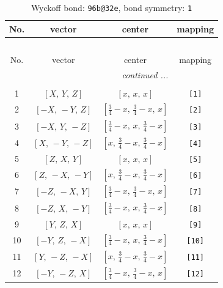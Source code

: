 \documentclass[fleqn,8pt]{jsarticle}
\begin{document}
\begin{longtable}{cccc}
\caption{Wyckoff bond: {\tt 96b@32e}, bond symmetry: {\tt 1}}
 \\
 \hline \hline
No. & vector & center & mapping \\ \hline \endfirsthead

\multicolumn{3}{l}{\tablename\ \thetable{}} \\
 \hline \hline
No. & vector & center & mapping \\ \hline \endhead

 \hline \hline
\multicolumn{3}{r}{\footnotesize\it continued ...} \\ \endfoot

 \hline \hline
\multicolumn{3}{r}{} \\ \endlastfoot

1 & $\left[ X,\, Y,\, Z \right]$ & $\left[ x,\, x,\, x \right]$ & {\tt [1]} \\ \hline
2 & $\left[ - X,\, - Y,\, Z \right]$ & $\left[ \frac{3}{4} - x,\, \frac{3}{4} - x,\, x \right]$ & {\tt [2]} \\ \hline
3 & $\left[ - X,\, Y,\, - Z \right]$ & $\left[ \frac{3}{4} - x,\, x,\, \frac{3}{4} - x \right]$ & {\tt [3]} \\ \hline
4 & $\left[ X,\, - Y,\, - Z \right]$ & $\left[ x,\, \frac{3}{4} - x,\, \frac{3}{4} - x \right]$ & {\tt [4]} \\ \hline
5 & $\left[ Z,\, X,\, Y \right]$ & $\left[ x,\, x,\, x \right]$ & {\tt [5]} \\ \hline
6 & $\left[ Z,\, - X,\, - Y \right]$ & $\left[ x,\, \frac{3}{4} - x,\, \frac{3}{4} - x \right]$ & {\tt [6]} \\ \hline
7 & $\left[ - Z,\, - X,\, Y \right]$ & $\left[ \frac{3}{4} - x,\, \frac{3}{4} - x,\, x \right]$ & {\tt [7]} \\ \hline
8 & $\left[ - Z,\, X,\, - Y \right]$ & $\left[ \frac{3}{4} - x,\, x,\, \frac{3}{4} - x \right]$ & {\tt [8]} \\ \hline
9 & $\left[ Y,\, Z,\, X \right]$ & $\left[ x,\, x,\, x \right]$ & {\tt [9]} \\ \hline
10 & $\left[ - Y,\, Z,\, - X \right]$ & $\left[ \frac{3}{4} - x,\, x,\, \frac{3}{4} - x \right]$ & {\tt [10]} \\ \hline
11 & $\left[ Y,\, - Z,\, - X \right]$ & $\left[ x,\, \frac{3}{4} - x,\, \frac{3}{4} - x \right]$ & {\tt [11]} \\ \hline
12 & $\left[ - Y,\, - Z,\, X \right]$ & $\left[ \frac{3}{4} - x,\, \frac{3}{4} - x,\, x \right]$ & {\tt [12]} \\ \hline

\end{longtable}
\end{document}
